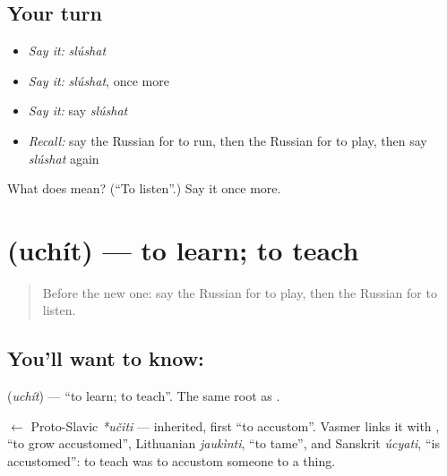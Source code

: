 \subsection*{Your turn}
\begin{itemize}
\raggedright
  \item \emph{Say it:} \emph{slúshat}
  \item \emph{Say it:} \emph{slúshat}, once more
  \item \emph{Say it:} say \emph{slúshat}
  \item \emph{Recall:} say the Russian for to run, then the Russian for to play, then say \emph{slúshat} again
\end{itemize}

\begin{tcolorbox}[breakable,colback=teal!4,colframe=teal!35!black,title={Before you move on}]
What does  mean? (\textquotedblleft{}To listen\textquotedblright{}.) Say it once more.
\end{tcolorbox}
\section[\texorpdfstring{\ru{учить} (uchít)}{учить (uchít)}]{ (uchít) — to learn; to teach}

\label{lesson:RU-C41-uchit}



\begin{quote}
Before the new one: say the Russian for to play, then the Russian for to listen.
\end{quote}

\subsection*{You'll want to know: }
\textbf{} (\emph{uchít}) — \textquotedblleft{}to learn; to teach\textquotedblright{}. The same root as \textbf{}.

\begin{cousinweb}
\textbf{} $\leftarrow$ Proto-Slavic \emph{*učiti} — inherited, first \textquotedblleft{}to accustom\textquotedblright{}. Vasmer links it with \emph{}, \textquotedblleft{}to grow accustomed\textquotedblright{}, Lithuanian \emph{jaukìnti}, \textquotedblleft{}to tame\textquotedblright{}, and Sanskrit \emph{úcyati}, \textquotedblleft{}is accustomed\textquotedblright{}: to teach was to accustom someone to a thing.
\end{cousinweb}

